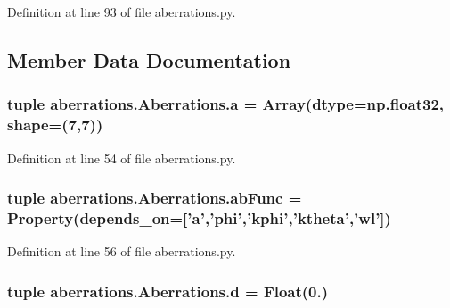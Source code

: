 Definition at line 93 of file aberrations.\-py.



\subsection{Member Data Documentation}
\hypertarget{classaberrations_1_1_aberrations_ae2ed062229548597367003ba97fc06af}{
\subsubsection[{a}]{\setlength{\rightskip}{0pt plus 5cm}tuple aberrations.\-Aberrations.\-a = Array(dtype=np.\-float32, shape=(7,7))\hspace{0.3cm}{\ttfamily [static]}}}\label{classaberrations_1_1_aberrations_ae2ed062229548597367003ba97fc06af}


Definition at line 54 of file aberrations.\-py.

\hypertarget{classaberrations_1_1_aberrations_a90060afaeacce97d1106a551744e2d88}{
\subsubsection[{ab\-Func}]{\setlength{\rightskip}{0pt plus 5cm}tuple aberrations.\-Aberrations.\-ab\-Func = Property(depends\-\_\-on=\mbox{[}'{\bf a}','{\bf phi}','{\bf kphi}','{\bf ktheta}','wl'\mbox{]})\hspace{0.3cm}{\ttfamily [static]}}}\label{classaberrations_1_1_aberrations_a90060afaeacce97d1106a551744e2d88}


Definition at line 56 of file aberrations.\-py.

\hypertarget{classaberrations_1_1_aberrations_a24b6f1c8db4c40bf846990969118e494}{
\subsubsection[{d}]{\setlength{\rightskip}{0pt plus 5cm}tuple aberrations.\-Aberrations.\-d = Float(0.)\hspace{0.3cm}{\ttfamily [static]}}}\label{classaberrations_1_1_aberrations_a24b6f1c8db4c40bf846990969118e494}


